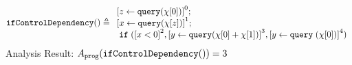             \begin{example}
                \[
                \kw{ifControlDependency()} \triangleq 
                \begin{array}{l}
                    \clabel{ \assign{z}{\query(\chi[0])}}^{0} ; \\
                    \clabel{\assign{x}{\query(\chi[z])} }^{1} ; \\
                    \eif(\clabel{x < 0}^{2}, 
                    \clabel{\assign{y}{\query(\chi[0] + \chi[1])}}^{3}, 
                    \clabel{\assign{y}\query{(\chi[0])}}^{4})
                \end{array}
                \]
                Analysis Result: $ A_{\mathtt{prog}}( \mathtt{ifControlDependency()}) = 3$
                \end{example}
    
